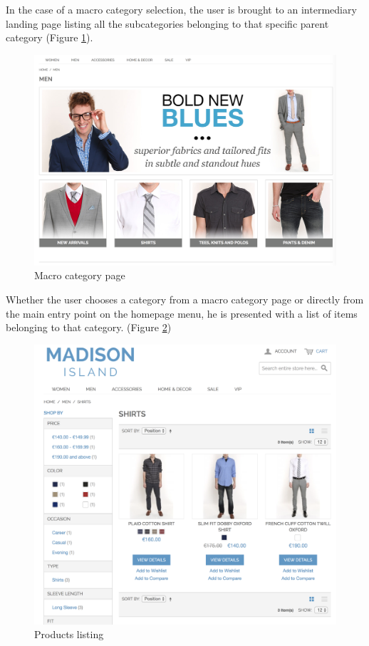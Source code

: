 In the case of a macro category selection, the user is brought to an intermediary landing page listing all the subcategories belonging to that specific parent category (Figure \ref{fig:category-cms}). 

\vspace{0.1cm}
\begin{figure}[htbp]
  \centering
    \includegraphics[width=12cm]{images/madison/category-cms.png}
  \caption{Macro category page}
  \label{fig:category-cms}
\end{figure}
\vspace{0.1cm}

Whether the user chooses a category from a macro category page or directly from the main entry point on the homepage menu, he is presented with a list of items belonging to that category. (Figure \ref{fig:products-list})

\vspace{0.1cm}
\begin{figure}[htbp]
  \centering
    \includegraphics[width=12cm]{images/madison/products-list.png}
  \caption{Products listing}
  \label{fig:products-list}
\end{figure}
\vspace{0.1cm}

